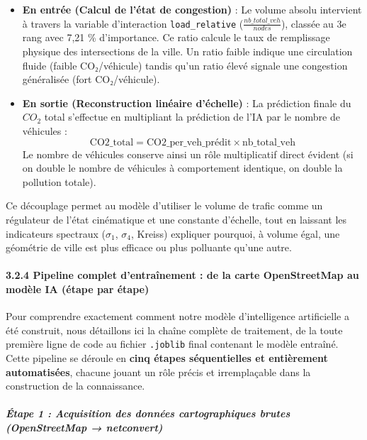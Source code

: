 \documentclass[10pt, a4paper]{article}
\providecommand{\tightlist}{}
\begin{document}
\begin{enumerate}
  \begin{itemize}
  \tightlist
  \item
    \textbf{En entrée (Calcul de l'état de congestion)} : Le volume
    absolu intervient à travers la variable d'interaction
    \texttt{load\_relative} (\(\frac{nb\_total\_veh}{nodes}\)), classée
    au 3e rang avec 7,21 \% d'importance. Ce ratio calcule le taux de
    remplissage physique des intersections de la ville. Un ratio faible
    indique une circulation fluide (faible CO₂/véhicule) tandis qu'un
    ratio élevé signale une congestion généralisée (fort CO₂/véhicule).
  \item
    \textbf{En sortie (Reconstruction linéaire d'échelle)} : La
    prédiction finale du \(CO_2\) total s'effectue en multipliant la
    prédiction de l'IA par le nombre de véhicules :
    \[\text{CO2\_total} = \text{CO2\_per\_veh\_prédit} \times \text{nb\_total\_veh}\]
    Le nombre de véhicules conserve ainsi un rôle multiplicatif direct
    évident (si on double le nombre de véhicules à comportement
    identique, on double la pollution totale).
  \end{itemize}
\end{enumerate}

Ce découplage permet au modèle d'utiliser le volume de trafic comme un
régulateur de l'état cinématique et une constante d'échelle, tout en
laissant les indicateurs spectraux (\(\sigma_1\), \(\sigma_4\), Kreiss)
expliquer pourquoi, à volume égal, une géométrie de ville est plus
efficace ou plus polluante qu'une autre.

\paragraph{3.2.4 Pipeline complet d'entraînement : de la carte
OpenStreetMap au modèle IA (étape par
étape)}\label{pipeline-complet-dentrauxeenement-de-la-carte-openstreetmap-au-moduxe8le-ia-uxe9tape-par-uxe9tape}

Pour comprendre exactement comment notre modèle d'intelligence
artificielle a été construit, nous détaillons ici la chaîne complète de
traitement, de la toute première ligne de code au fichier
\texttt{.joblib} final contenant le modèle entraîné. Cette pipeline se
déroule en \textbf{cinq étapes séquentielles et entièrement
automatisées}, chacune jouant un rôle précis et irremplaçable dans la
construction de la connaissance.

\subparagraph{Étape 1 : Acquisition des données cartographiques brutes
(OpenStreetMap →
netconvert)}\label{uxe9tape-1-acquisition-des-donnuxe9es-cartographiques-brutes-openstreetmap-netconvert}
\end{document}
